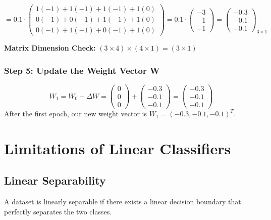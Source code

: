 \[
= 0.1 \cdot \begin{pmatrix}
1(-1) + 1(-1) + 1(-1) + 1(0) \\
0(-1) + 0(-1) + 1(-1) + 1(0) \\
0(-1) + 1(-1) + 0(-1) + 1(0)
\end{pmatrix} = 0.1 \cdot \begin{pmatrix}
-3 \\
-1 \\
-1
\end{pmatrix} = \begin{pmatrix}
-0.3 \\
-0.1 \\
-0.1
\end{pmatrix}_{3 \times 1}
\]

\textbf{Matrix Dimension Check:} \((3 \times 4) \times (4 \times 1) = (3 \times 1)\) 

\subsubsection{Step 5: Update the Weight Vector W}
\[
W_1 = W_0 + \Delta W =
\begin{pmatrix}
0 \\
0 \\
0
\end{pmatrix}
+
\begin{pmatrix}
-0.3 \\
-0.1 \\
-0.1
\end{pmatrix}
=
\begin{pmatrix}
-0.3 \\
-0.1 \\
-0.1
\end{pmatrix}
\]
After the first epoch, our new weight vector is \(W_1 = (-0.3, -0.1, -0.1)^T\).



\section{Limitations of Linear Classifiers}

\subsection{Linear Separability}

\begin{definition}
A dataset is linearly separable if there exists a linear decision boundary that perfectly separates the two classes.
\end{definition}

